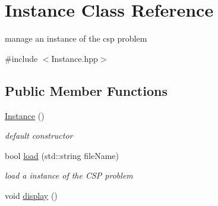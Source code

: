 \hypertarget{classInstance}{}\section{Instance Class Reference}
\label{classInstance}


manage an instance of the csp problem  




{\ttfamily \#include $<$Instance.\+hpp$>$}

\subsection*{Public Member Functions}
\begin{DoxyCompactItemize}
\item 
\hyperlink{classInstance_a399506c7e75ab9ab78fbc34a25932bbd}{Instance} ()\hypertarget{classInstance_a399506c7e75ab9ab78fbc34a25932bbd}{}\label{classInstance_a399506c7e75ab9ab78fbc34a25932bbd}

\begin{DoxyCompactList}\small\item\em default constructor \end{DoxyCompactList}\item 
bool \hyperlink{classInstance_aa0017965792e0bff1c4f3cb869d46ad2}{load} (std\+::string file\+Name)
\begin{DoxyCompactList}\small\item\em load a instance of the C\+SP problem \end{DoxyCompactList}\item 
void \hyperlink{classInstance_a490f1cebae4667a27477876199f5ec15}{display} ()\hypertarget{classInstance_a490f1cebae4667a27477876199f5ec15}{}\label{classInstance_a490f1cebae4667a27477876199f5ec15}


\end{DoxyCompactItemize}

